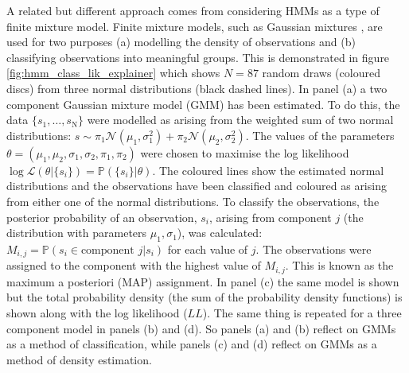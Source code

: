 A related but different approach comes from  considering HMMs as a type of finite mixture model. \cite{mclachlanFiniteMixtureModels2000} Finite mixture models, such as Gaussian mixtures \cite{reynolds2009gaussian}, are used for two purposes (a) modelling the density of observations and (b) classifying observations into meaningful groups.\cite{mclachlan1988mixture} This is demonstrated in figure \ref{fig:hmm_class_lik_explainer} which shows $N = \num{87}$ random draws (coloured discs) from three normal distributions (black dashed lines). In panel (a) a two component Gaussian mixture model (GMM) has been estimated. To do this, the data $\{s_{1}, \ldots, s_{\mathrm{N}}\}$ were modelled as arising from the weighted sum of two normal distributions: $s \sim \pi_{1}\mathcal{N}\left(\mu_{1}, \sigma_{1}^{2}\right) +  \pi_{2}\mathcal{N}\left(\mu_{2}, \sigma_{2}^{2}\right)$. The values of the parameters $\theta = (\mu_{1}, \mu_{2}, \sigma_{1}, \sigma_{2}, \pi_{1}, \pi_{2})$ were chosen to maximise the log likelihood $\log{\mathcal{L}(\theta | \{s_{i}\})} = \mathbb{P}(\{s_{i}\}|\theta)$.  The coloured lines show the estimated normal distributions and the observations have been classified and coloured as arising from either one of the normal distributions. To classify the observations, the posterior probability of an  observation, $s_{i}$, arising from component $j$ (the distribution with parameters $\mu_{1}, \sigma_{1}$), was calculated: $M_{i,j}=\mathbb{P}(s_{i} \in \text{component }j |s_{i})$ for each value of $j$. The observations were assigned to the component with the highest value of $M_{i, j}$. This is known as the maximum a posteriori (MAP) assignment. In panel (c) the same model is shown but the total probability density (the sum of the probability density functions) is shown along with the log likelihood ($LL$). The same thing is repeated for a three component model in panels (b) and (d). So panels (a) and (b) reflect on GMMs as a method of classification, while panels (c) and (d) reflect on GMMs as a method of density estimation. 

